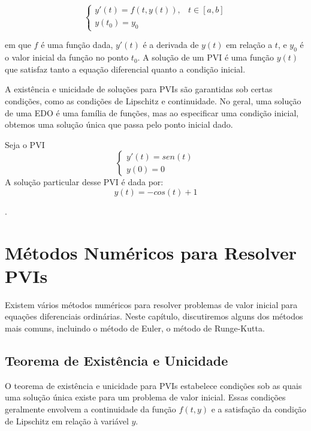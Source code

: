 \begin{equation}
    \begin{cases}
        y'(t) = f(t, y(t)), & t \in [a, b] \\
        y(t_0) = y_0
    \end{cases}
\end{equation}

em que $f$ é uma função dada, $y'(t)$ é a derivada de $y(t)$ em relação a $t$,
e $y_0$ é o valor inicial da função no ponto $t_0$. A solução de um PVI é uma
função $y(t)$ que satisfaz tanto a equação diferencial quanto a condição
inicial.

A existência e unicidade de soluções para PVIs são garantidas sob certas
condições, como as condições de Lipschitz e continuidade. No geral, uma solução
de uma EDO é uma família de funções, mas ao especificar uma condição inicial,
obtemos uma solução única que passa pelo ponto inicial dado.
\begin{ex}
    Seja o PVI
    \begin{equation}
        \begin{cases}
            y'(t) = sen(t) \\
            y(0) = 0
        \end{cases}
    \end{equation}
    A solução particular desse PVI é dada por:
    \begin{equation}
        y(t) = -cos(t) + 1
    \end{equation}

    .
\end{ex}

\section{Métodos Numéricos para Resolver PVIs}

Existem vários métodos numéricos para resolver problemas de valor inicial para
equações diferenciais ordinárias. Neste capítulo, discutiremos alguns dos
métodos mais comuns, incluindo o método de Euler, o método de Runge-Kutta.

\subsection{Teorema de Existência e Unicidade}
O teorema de existência e unicidade para PVIs estabelece condições sob as quais
uma solução única existe para um problema de valor inicial. Essas condições
geralmente envolvem a continuidade da função $f(t, y)$ e a satisfação da
condição de Lipschitz em relação à variável $y$.

